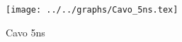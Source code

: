 \begin{figure}[h] \centering\texttt{[image: ../../graphs/Cavo\_5ns.tex]}\caption{Cavo 5ns}\label{gr:Cavo_5ns} \end{figure}
